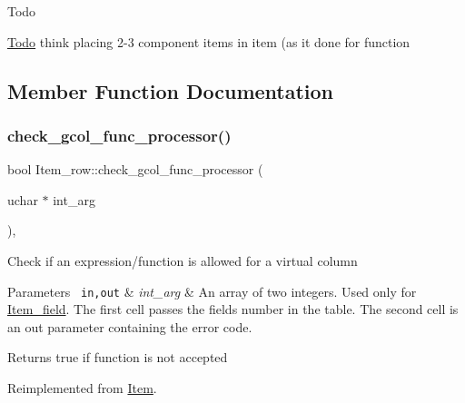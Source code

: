 \begin{DoxyRefDesc}{Todo}
\item[\mbox{\hyperlink{todo__todo000033}{Todo}}]think placing 2-\/3 component items in item (as it done for function \end{DoxyRefDesc}


\subsection{Member Function Documentation}
\mbox{\label{classItem__row_abaff5b82ee17b24e4a5d24a3c71b29b4}} 
\subsubsection{\texorpdfstring{check\+\_\+gcol\+\_\+func\+\_\+processor()}{check\_gcol\_func\_processor()}}
{\footnotesize\ttfamily bool Item\+\_\+row\+::check\+\_\+gcol\+\_\+func\+\_\+processor (\begin{DoxyParamCaption}\item[{uchar $\ast$}]{int\+\_\+arg }\end{DoxyParamCaption})\hspace{0.3cm}{\ttfamily [inline]}, {\ttfamily [virtual]}}

Check if an expression/function is allowed for a virtual column


\begin{DoxyParams}[1]{Parameters}
\mbox{\texttt{ in,out}}  & {\em int\+\_\+arg} & An array of two integers. Used only for \mbox{\hyperlink{classItem__field}{Item\+\_\+field}}. The first cell passes the field\textquotesingle{}s number in the table. The second cell is an out parameter containing the error code.\\
\hline
\end{DoxyParams}
\begin{DoxyReturn}{Returns}
true if function is not accepted 
\end{DoxyReturn}


Reimplemented from \mbox{\hyperlink{classItem_af75e3659f732265cbe72824803f208f2}{Item}}.

\mbox{\label{classItem__row_a2da513a82afd5830483e351dbc9c2dad}} 
